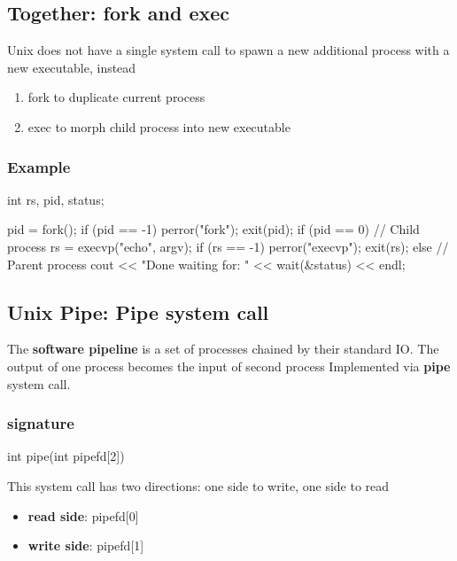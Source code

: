 \documentclass{report}
\begin{document}
        \subsection{Together: fork and exec}
        \bigbreak \noindent 
        Unix does not have a single system call to spawn a new additional process with a new executable, instead
        \begin{enumerate}
            \item fork to duplicate current process
            \item exec to morph child process into new executable
        \end{enumerate}

        \bigbreak \noindent 
        \subsubsection{Example}
        \bigbreak \noindent 
        \begin{cppcode}
        int rs, pid, status;

        pid = fork();
        if (pid == -1) {
            perror("fork");
            exit(pid);
        }
        if (pid == 0) {  // Child process
            rs = execvp("echo", argv);
            if (rs == -1) {
                perror("execvp");
                exit(rs);
            }
        } else { // Parent process
            cout << "Done waiting for: " << wait(&status) << endl;
        }
        \end{cppcode}

        \bigbreak \noindent 
        \subsection{Unix Pipe: Pipe system call}
        \bigbreak \noindent 
        The \textbf{software pipeline} is a set of processes chained by their standard IO. The output of one process becomes the input of second process
        \bigbreak \noindent 
        Implemented via \textbf{pipe} system call.
        \bigbreak \noindent 
        \subsubsection{signature}
        \bigbreak \noindent 
        \begin{cppcode}
            int pipe(int pipefd[2])
        \end{cppcode}
        \bigbreak \noindent 
        This system call has two directions: one side to write, one side to read
        \begin{itemize}
            \item \textbf{read side}: pipefd[0]
            \item \textbf{write side}: pipefd[1]
        \end{itemize}
\end{document}
